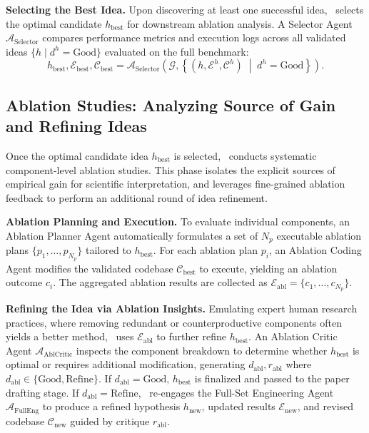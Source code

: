 \noindent\textbf{Selecting the Best Idea.}
Upon discovering at least one successful idea, \sname~selects the optimal candidate $h_{\mathrm{best}}$ for downstream ablation analysis.
A Selector Agent $\mathcal{A}_{\mathrm{Selector}}$ compares performance metrics and execution logs across all validated ideas $\{ h \mid d^h = \mathrm{Good} \}$ evaluated on the full benchmark:
\begin{equation}
    h_{\mathrm{best}}, \mathcal{E}_{\mathrm{best}}, \mathcal{C}_{\mathrm{best}} = \mathcal{A}_{\mathrm{Selector}}\left(\mathcal{G}, \left\{ (h, \mathcal{E}^h, \mathcal{C}^h) \;\middle|\; d^h = \mathrm{Good} \right\}\right).
\end{equation}

\subsection{Ablation Studies: Analyzing Source of Gain and Refining Ideas}\label{subsec:ablating_idea}
Once the optimal candidate idea $h_{\mathrm{best}}$ is selected, \sname~conducts systematic component-level ablation studies.
This phase isolates the explicit sources of empirical gain for scientific interpretation, and leverages fine-grained ablation feedback to perform an additional round of idea refinement.

\noindent\textbf{Ablation Planning and Execution.}
To evaluate individual components, an Ablation Planner Agent automatically formulates a set of $N_p$ executable ablation plans $\{p_1, \dots, p_{N_p}\}$ tailored to $h_{\mathrm{best}}$.
For each ablation plan $p_i$, an Ablation Coding Agent modifies the validated codebase $\mathcal{C}_{\mathrm{best}}$ to execute, yielding an ablation outcome $c_i$.
The aggregated ablation results are collected as $\mathcal{E}_{\mathrm{abl}} = \{c_1, \dots, c_{N_p}\}$.

\noindent\textbf{Refining the Idea via Ablation Insights.}
Emulating expert human research practices, where removing redundant or counterproductive components often yields a better method, \sname~uses $\mathcal{E}_{\mathrm{abl}}$ to further refine $h_{\mathrm{best}}$.
An Ablation Critic Agent $\mathcal{A}_{\mathrm{AblCritic}}$ inspects the component breakdown to determine whether $h_{\mathrm{best}}$ is optimal or requires additional modification, generating $d_{\mathrm{abl}}, r_{\mathrm{abl}}$ where $d_{\mathrm{abl}} \in \{\mathrm{Good}, \mathrm{Refine}\}$.
If $d_{\mathrm{abl}} = \mathrm{Good}$, $h_{\mathrm{best}}$ is finalized and passed to the paper drafting stage.
If $d_{\mathrm{abl}} = \mathrm{Refine}$, \sname~re-engages the Full-Set Engineering Agent $\mathcal{A}_{\mathrm{FullEng}}$ to produce a refined hypothesis $h_{\mathrm{new}}$, updated results $\mathcal{E}_{\mathrm{new}}$, and revised codebase $\mathcal{C}_{\mathrm{new}}$ guided by critique $r_{\mathrm{abl}}$.

